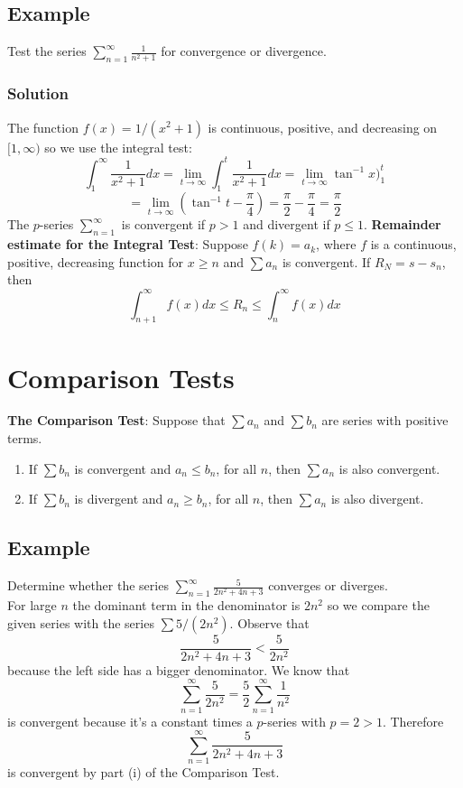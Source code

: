 \subsection*{Example}
Test the series $\sum^\infty_{n = 1} \frac{1}{n^2 + 1}$ for convergence or divergence.
\subsubsection*{Solution}
The function $f(x) = 1/(x^2 + 1)$ is continuous, positive, and decreasing on $[1,\infty)$ so we use the integral test:
$$\int^\infty_1 \frac{1}{x^2 + 1} dx = \lim_{t\rightarrow\infty}\int^t_1 \frac{1}{x^2 + 1} dx = \lim_{t\rightarrow\infty}\tan^{-1}{x}\Big)^t_1$$
$$= \lim_{t\rightarrow\infty}(\tan^{-1}{t} - \frac{\pi}{4}) = \frac{\pi}{2} - \frac{\pi}{4} = \frac{\pi}{2}$$
The $p$-series $\sum^\infty_{n = 1}$ is convergent if $p > 1$ and divergent if $p\leq 1$.
\textbf{Remainder estimate for the Integral Test}: Suppose $f(k) = a_k$, where $f$ is a continuous, positive, decreasing function for $x\geq n$ and $\sum a_n$ is convergent. If $R_N = s - s_n$, then
$$\int^\infty_{n + 1} f(x) dx\leq R_n\leq \int^\infty_n f(x) dx$$

\section{Comparison Tests}
\textbf{The Comparison Test}: Suppose that $\textstyle\sum a_n$ and $\textstyle\sum b_n$ are series with positive terms. 
\begin{enumerate}[i]
    \item If $\textstyle\sum b_n$ is convergent and $a_n\leq b_n$, for all $n$, then $\textstyle\sum a_n$ is also convergent.
    \item If $\textstyle\sum b_n$ is divergent and $a_n\geq b_n$, for all $n$, then $\textstyle\sum a_n$ is also divergent.
\end{enumerate}

\subsection*{Example}
Determine whether the series $\sum^\infty_{n = 1} \frac{5}{2n^2 + 4n + 3}$ converges or diverges. \\
For large $n$ the dominant term in the denominator is $2n^2$ so we compare the given series with the series $\textstyle\sum 5/(2n^2)$. Observe that 
$$\frac{5}{2n^2 + 4n + 3} < \frac{5}{2n^2}$$
because the left side has a bigger denominator. We know that $$\sum^\infty_{n = 1}\frac{5}{2n^2} = \frac{5}{2}\sum^\infty_{n = 1}\frac{1}{n^2}$$
is convergent because it's a constant times a $p$-series with $p = 2 > 1$. Therefore 
$$\sum^\infty_{n = 1} \frac{5}{2n^2 + 4n + 3}$$
is convergent by part (i) of the Comparison Test.

